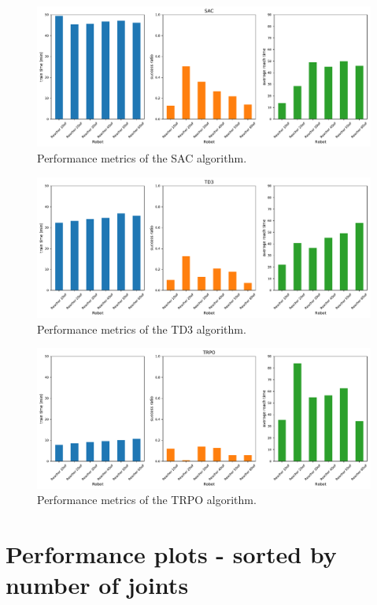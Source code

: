 \documentclass{article}
\begin{document}
\begin{figure}[H]
    \centering
    \includegraphics[width=\textwidth]{../SAC.pdf}
\caption{Performance metrics of the SAC algorithm.}
\end{figure}

\begin{figure}[H]
    \centering
    \includegraphics[width=\textwidth]{../TD3.pdf}
\caption{Performance metrics of the TD3 algorithm.}
\end{figure}

\begin{figure}[H]
    \centering
    \includegraphics[width=\textwidth]{../TRPO.pdf}
\caption{Performance metrics of the TRPO algorithm.}
\end{figure}



\section{Performance plots - sorted by number of joints}
\end{document}
